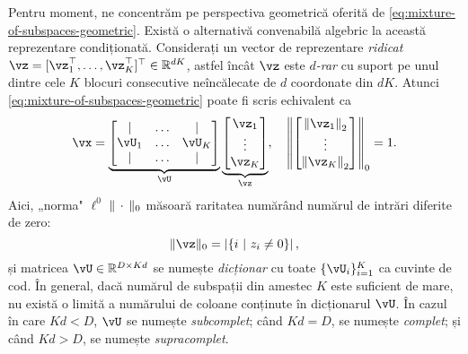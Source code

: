 \documentclass[../../book-main_ro.tex]{subfiles}
\begin{document}
Pentru moment, ne concentrăm pe perspectiva geometrică oferită de \eqref{eq:mixture-of-subspaces-geometric}.
Există o alternativă convenabilă algebric la această reprezentare condiționată. Considerați un vector de reprezentare \textit{ridicat} $\vz = [\vz_1^\top, \dots, \vz_K^\top]^\top \in \R^{dK}$, astfel încât $\vz$ este \textit{$d$-rar} cu suport pe unul dintre cele $K$ blocuri consecutive neîncălecate de $d$ coordonate din $dK$. 
Atunci \eqref{eq:mixture-of-subspaces-geometric} poate fi scris echivalent ca
\begin{equation}\label{eq:mixture-of-subspaces-dictionary-pre}
    \vx = 
    \underbrace{
    \begin{bmatrix} 
    | & \hdots & |  \\
    \vU_1 & \hdots & \vU_K  \\
    | & \hdots & | 
    \end{bmatrix} 
    }_{\vU}
    \underbrace{
    \begin{bmatrix} \vz_1 \\ \vdots \\ \vz_K \end{bmatrix}
    }_{\vz},
    \quad
    \norm*{
    \begin{bmatrix} \norm*{\vz_1}_2 \\ \vdots \\ \norm*{\vz_K}_2 \end{bmatrix}
    }_0 = 1.
\end{equation}
Aici, „norma" $\ell^0$ $\norm{\,\cdot\,}_0$ măsoară raritatea numărând numărul de intrări diferite de zero:
\begin{equation}\label{eq:ell-zero-norm}
    \norm{\vz}_0 = \abs*{\set{i \given z_i \neq 0}},
\end{equation}
și matricea $\vU \in \R^{D \times Kd}$ se numește \textit{dicționar} cu toate $\{\vU_i\}_{i=1}^K$ ca cuvinte de cod. În general, dacă numărul de subspații din amestec $K$ este suficient de mare, nu există o limită a numărului de coloane conținute în dicționarul $\vU$. În cazul în care $Kd < D$, $\vU$ se numește \textit{subcomplet};
când $Kd = D$, se numește \textit{complet}; și când $Kd > D$, se numește \textit{supracomplet}. 
\end{document}
